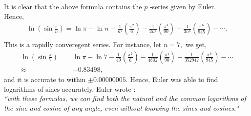 \documentclass[a4paper,reqno,11pt]{book}
\theoremstyle{plain}%
\theoremstyle{definition}
\begin{document}
It is clear that the above formula contains the $p$ -series given by Euler.\\
Hence,\\
\begin{eqnarray*} \ln(\sin \frac{\pi}{n}) = \ln \pi - \ln n -\frac{1}{n^2}\left(\frac{\pi^2}{6}\right) -\frac{1}{2n^4}\left(\frac{\pi^4}{90}\right) -\frac{1}{3n^6}\left(\frac{\pi^6}{945}\right) -\cdots.\\ \end{eqnarray*}
This is a rapidly converegent series. For instance, let $n = 7,$ we get,\\
\begin{align*}
\ln(\sin \frac{\pi}{7}) =& \ln \pi - \ln 7 -\frac{1}{49}\left(\frac{\pi^2}{6}\right) -\frac{1}{4802}\left(\frac{\pi^4}{90}\right) -\frac{1}{352947}\left(\frac{\pi^6}{945}\right) -\cdots\\
\approx& -0.83498,
\end{align*}
and it is accurate to within $\pm0.00000005.$ Hence, Euler was able to find logarithms of sines accurately.
 Euler wrote :\\
\indent \textit{``with these formulas, we can find both the natural and the common 
logarithms of the sine and cosine of any angle, even without knowing 
the sines and cosines."} \\
\end{document}
